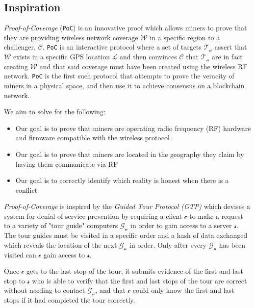 \documentclass[letterpaper,11pt]{article}
\def\coverage/{$\mathcal{W}$}
\def\location/{$\mathcal{L}$}
\def\proofofcoverage/{\textit{Proof-of-Coverage}}
\begin{document}
\subsection{Inspiration}

\proofofcoverage/ (\verb|PoC|) is an innovative proof which allows miners to prove that they are providing wireless network coverage \coverage/ in a specific region to a challenger, $\mathcal{C}$. \verb|PoC| is an interactive protocol where a set of targets $\mathcal{T_n}$ assert that \coverage/ exists in a specific GPS location \location/ and then convinces $\mathcal{C}$ that $\mathcal{T_n}$ are in fact creating \coverage/ and that said coverage must have been created using the wireless RF network. \verb|PoC| is the first such protocol that attempts to prove the veracity of miners in a physical space, and then use it to achieve consensus on a blockchain network.\newline

We aim to solve for the following:

\begin{itemize}
	\item Our goal is to prove that miners are operating radio frequency (RF) hardware and firmware compatible with the wireless protocol
	\item Our goal is to prove that miners are located in the geography they claim by having them communicate via RF
	\item Our goal is to correctly identify which reality is honest when there is a conflict
\end{itemize}

\proofofcoverage/ is inspired by the \textit{Guided Tour Protocol (GTP)} which devises a system for denial of service prevention by requiring a client $\mathcal{c}$ to make a request to a variety of "tour guide" computers $\mathcal{G_n}$ in order to gain access to a server $\mathcal{s}$. The tour guides must be visited in a specific order and a hash of data exchanged which reveals the location of the next $\mathcal{G_n}$ in order. Only after every $\mathcal{G_n}$ has been visited can $\mathcal{c}$ gain access to $\mathcal{s}$.\newline

Once $\mathcal{c}$ gets to the last stop of the tour, it submits evidence of the first and last stop to $\mathcal{s}$ who is able to verify that the first and last stops of the tour are correct without needing to contact $\mathcal{G_n}$, and that $\mathcal{c}$ could only know the first and last stops if it had completed the tour correctly.\newline
\end{document}
